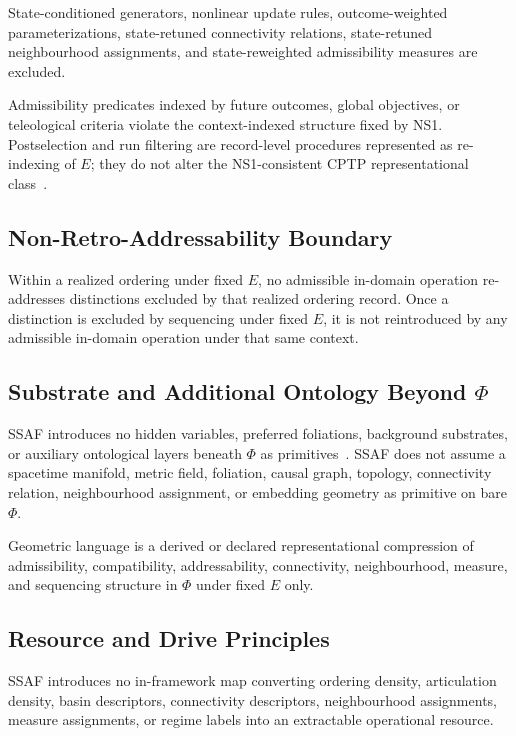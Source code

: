 \documentclass[aps,prx,onecolumn,11pt]{revtex4-2}
\theoremstyle{plain}
\theoremstyle{definition}
\theoremstyle{remark}
\begin{document}
State-conditioned generators, nonlinear update rules, outcome-weighted
parameterizations, state-retuned connectivity relations,
state-retuned neighbourhood assignments, and state-reweighted
admissibility measures are excluded.

Admissibility predicates indexed by future outcomes, global objectives,
or teleological criteria violate the context-indexed structure fixed by
NS1. Postselection and run filtering are record-level procedures
represented as re-indexing of \(E\); they do not alter the
NS1-consistent CPTP representational class~\cite{NielsenChuang2010,
Watrous2018}.

\subsection{Non-Retro-Addressability Boundary}
\label{subsec:failure_retro_addressability}

Within a realized ordering under fixed \(E\), no admissible in-domain
operation re-addresses distinctions excluded by that realized ordering
record. Once a distinction is excluded by sequencing under fixed \(E\),
it is not reintroduced by any admissible in-domain operation under that
same context.

\subsection{Substrate and Additional Ontology Beyond \(\Phi\)}
\label{subsec:failure_substrate_reintroduction}

SSAF introduces no hidden variables, preferred foliations, background
substrates, or auxiliary ontological layers beneath \(\Phi\) as
primitives~\cite{Bell1964}. SSAF does not assume a spacetime manifold,
metric field, foliation, causal graph, topology, connectivity relation,
neighbourhood assignment, or embedding geometry as primitive on bare
\(\Phi\).

Geometric language is a derived or declared representational compression
of admissibility, compatibility, addressability, connectivity,
neighbourhood, measure, and sequencing structure in \(\Phi\) under fixed
\(E\) only.

\subsection{Resource and Drive Principles}
\label{subsec:failure_resource_drive}

SSAF introduces no in-framework map converting ordering density,
articulation density, basin descriptors, connectivity descriptors,
neighbourhood assignments, measure assignments, or regime labels into an
extractable operational resource.
\end{document}
